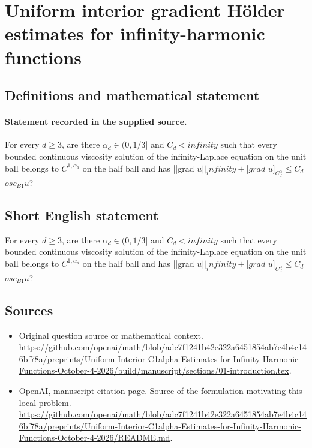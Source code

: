 \documentclass[11pt]{article}
\begin{document}
\section*{Uniform interior gradient Hölder estimates for infinity-harmonic functions}\label{30007328}
\subsection{Definitions and mathematical statement}
\paragraph{Statement recorded in the supplied source.}
For every $d\geq 3$, are there $\alpha _d\in (0,1/3]$ and $C_d<infinity$ such that every bounded continuous viscosity solution of the infinity-Laplace equation on the unit ball belongs to $C^{1,\alpha _d}$ on the half ball and has ||grad $u||_infinity+[grad$ $u]_{C^\alpha _d}\leq C_d$ $osc_{B1}u$?
\subsection{Short English statement}
For every $d\geq 3$, are there $\alpha _d\in (0,1/3]$ and $C_d<infinity$ such that every bounded continuous viscosity solution of the infinity-Laplace equation on the unit ball belongs to $C^{1,\alpha _d}$ on the half ball and has ||grad $u||_infinity+[grad$ $u]_{C^\alpha _d}\leq C_d$ $osc_{B1}u$?
\subsection{Sources}
\begin{itemize}
\item[S1] Original question source or mathematical context.
\url{https://github.com/openai/math/blob/adc7f1241b42e322a6451854ab7e4b4c146bf78a/preprints/Uniform-Interior-C1alpha-Estimates-for-Infinity-Harmonic-Functions-October-4-2026/build/manuscript/sections/01-introduction.tex}.
\item[S2] OpenAI, manuscript citation page. Source of the formulation motivating this local problem.
\url{https://github.com/openai/math/blob/adc7f1241b42e322a6451854ab7e4b4c146bf78a/preprints/Uniform-Interior-C1alpha-Estimates-for-Infinity-Harmonic-Functions-October-4-2026/README.md}.
\end{itemize}
\end{document}
